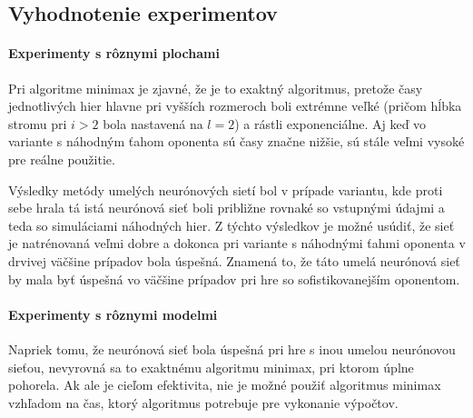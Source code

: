 \subsection{Vyhodnotenie experimentov}

\paragraph{Experimenty s rôznymi plochami}

Pri algoritme minimax je zjavné, že je to exaktný algoritmus, pretože časy jednotlivých hier hlavne pri vyšších
rozmeroch boli extrémne veľké (pričom hĺbka stromu pri $i>2$ bola nastavená na $l=2$) a rástli exponenciálne.
Aj keď vo variante s náhodným ťahom oponenta sú časy značne nižšie, sú stále veľmi vysoké pre reálne použitie.

Výsledky metódy umelých neurónových sietí bol v prípade variantu, kde proti sebe hrala tá istá neurónová sieť
boli približne rovnaké so vstupnými údajmi a teda so simuláciami náhodných hier.
Z týchto výsledkov je možné usúdiť, že sieť je natrénovaná veľmi dobre a dokonca pri variante s náhodnými ťahmi oponenta
v drvivej väčšine prípadov bola úspešná.
Znamená to, že táto umelá neurónová sieť by mala byť úspešná vo väčšine prípadov pri hre so sofistikovanejším oponentom.

\paragraph{Experimenty s rôznymi modelmi}

Napriek tomu, že neurónová sieť bola úspešná pri hre s inou umelou neurónovou sieťou, nevyrovná sa to exaktnému
algoritmu minimax, pri ktorom úplne pohorela.
Ak ale je cieľom efektivita, nie je možné použiť algoritmus minimax vzhľadom na čas, ktorý algoritmus potrebuje pre
vykonanie výpočtov.
